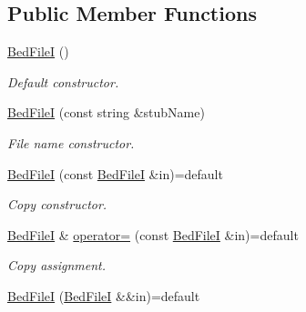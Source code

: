 \subsection*{Public Member Functions}
\begin{DoxyCompactItemize}
\item 
\mbox{\label{classvarfiles_1_1_bed_file_i_ace85c86d9964ec488e1085a08e925cee}} 
\hyperlink{classvarfiles_1_1_bed_file_i_ace85c86d9964ec488e1085a08e925cee}{Bed\+FileI} ()
\begin{DoxyCompactList}\small\item\em Default constructor. \end{DoxyCompactList}\item 
\hyperlink{classvarfiles_1_1_bed_file_i_a08cbc6ce12b27682fe9742317be1d434}{Bed\+FileI} (const string \&stub\+Name)
\begin{DoxyCompactList}\small\item\em File name constructor. \end{DoxyCompactList}\item 
\mbox{\label{classvarfiles_1_1_bed_file_i_a05199e1d75a2579a18f721df3b76d8f0}} 
\hyperlink{classvarfiles_1_1_bed_file_i_a05199e1d75a2579a18f721df3b76d8f0}{Bed\+FileI} (const \hyperlink{classvarfiles_1_1_bed_file_i}{Bed\+FileI} \&in)=default
\begin{DoxyCompactList}\small\item\em Copy constructor. \end{DoxyCompactList}\item 
\mbox{\label{classvarfiles_1_1_bed_file_i_a227bced32a25274d9c402906eb9f9221}} 
\hyperlink{classvarfiles_1_1_bed_file_i}{Bed\+FileI} \& \hyperlink{classvarfiles_1_1_bed_file_i_a227bced32a25274d9c402906eb9f9221}{operator=} (const \hyperlink{classvarfiles_1_1_bed_file_i}{Bed\+FileI} \&in)=default
\begin{DoxyCompactList}\small\item\em Copy assignment. \end{DoxyCompactList}\item 
\mbox{\label{classvarfiles_1_1_bed_file_i_a59ca0c9bb1c0501ba4badb8c11136957}} 
\hyperlink{classvarfiles_1_1_bed_file_i_a59ca0c9bb1c0501ba4badb8c11136957}{Bed\+FileI} (\hyperlink{classvarfiles_1_1_bed_file_i}{Bed\+FileI} \&\&in)=default

\end{DoxyCompactItemize}
